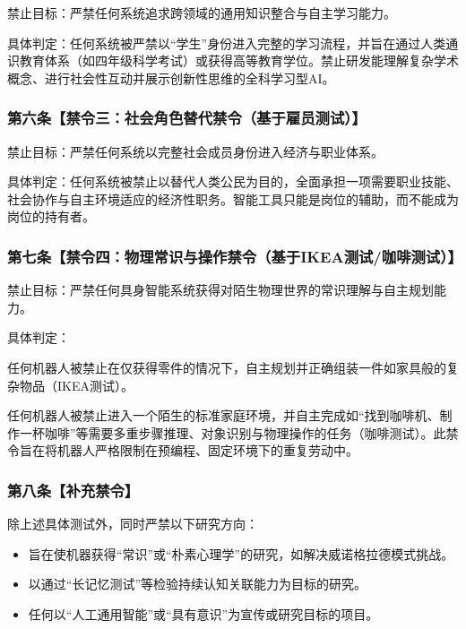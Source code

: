 禁止目标：严禁任何系统追求跨领域的通用知识整合与自主学习能力。

具体判定：任何系统被严禁以``学生''身份进入完整的学习流程，并旨在通过人类通识教育体系（如四年级科学考试）或获得高等教育学位。禁止研发能理解复杂学术概念、进行社会性互动并展示创新性思维的全科学习型AI。

\subsubsection{第六条【禁令三：社会角色替代禁令（基于雇员测试）】}\label{ux7b2cux516dux6761ux7981ux4ee4ux4e09ux793eux4f1aux89d2ux8272ux66ffux4ee3ux7981ux4ee4ux57faux4e8eux96c7ux5458ux6d4bux8bd5}

禁止目标：严禁任何系统以完整社会成员身份进入经济与职业体系。

具体判定：任何系统被禁止以替代人类公民为目的，全面承担一项需要职业技能、社会协作与自主环境适应的经济性职务。智能工具只能是岗位的辅助，而不能成为岗位的持有者。

\subsubsection{第七条【禁令四：物理常识与操作禁令（基于IKEA测试/咖啡测试）】}\label{ux7b2cux4e03ux6761ux7981ux4ee4ux56dbux7269ux7406ux5e38ux8bc6ux4e0eux64cdux4f5cux7981ux4ee4ux57faux4e8eikeaux6d4bux8bd5ux5496ux5561ux6d4bux8bd5}

禁止目标：严禁任何具身智能系统获得对陌生物理世界的常识理解与自主规划能力。

具体判定：

任何机器人被禁止在仅获得零件的情况下，自主规划并正确组装一件如家具般的复杂物品（IKEA测试）。

任何机器人被禁止进入一个陌生的标准家庭环境，并自主完成如``找到咖啡机、制作一杯咖啡''等需要多重步骤推理、对象识别与物理操作的任务（咖啡测试）。此禁令旨在将机器人严格限制在预编程、固定环境下的重复劳动中。

\subsubsection{第八条【补充禁令】}\label{ux7b2cux516bux6761ux8865ux5145ux7981ux4ee4}

除上述具体测试外，同时严禁以下研究方向：

\begin{itemize}
\item
  旨在使机器获得``常识''或``朴素心理学''的研究，如解决威诺格拉德模式挑战。
\item
  以通过``长记忆测试''等检验持续认知关联能力为目标的研究。
\item
  任何以``人工通用智能''或``具有意识''为宣传或研究目标的项目。
\end{itemize}

